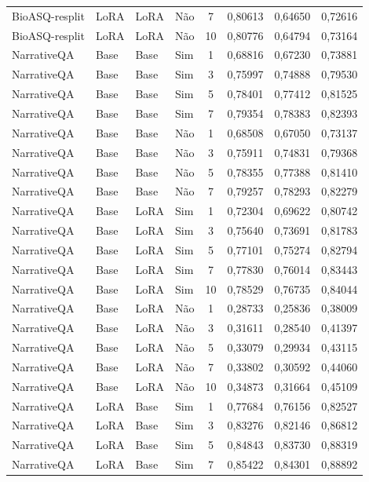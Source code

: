\begin{longtable}{llllcccc}
BioASQ-resplit & LoRA & LoRA & Não & 7 & 0,80613 & 0,64650 & 0,72616 \\
BioASQ-resplit & LoRA & LoRA & Não & 10 & 0,80776 & 0,64794 & 0,73164 \\
NarrativeQA & Base & Base & Sim & 1 & 0,68816 & 0,67230 & 0,73881 \\
NarrativeQA & Base & Base & Sim & 3 & 0,75997 & 0,74888 & 0,79530 \\
NarrativeQA & Base & Base & Sim & 5 & 0,78401 & 0,77412 & 0,81525 \\
NarrativeQA & Base & Base & Sim & 7 & 0,79354 & 0,78383 & 0,82393 \\
NarrativeQA & Base & Base & Não & 1 & 0,68508 & 0,67050 & 0,73137 \\
NarrativeQA & Base & Base & Não & 3 & 0,75911 & 0,74831 & 0,79368 \\
NarrativeQA & Base & Base & Não & 5 & 0,78355 & 0,77388 & 0,81410 \\
NarrativeQA & Base & Base & Não & 7 & 0,79257 & 0,78293 & 0,82279 \\
NarrativeQA & Base & LoRA & Sim & 1 & 0,72304 & 0,69622 & 0,80742 \\
NarrativeQA & Base & LoRA & Sim & 3 & 0,75640 & 0,73691 & 0,81783 \\
NarrativeQA & Base & LoRA & Sim & 5 & 0,77101 & 0,75274 & 0,82794 \\
NarrativeQA & Base & LoRA & Sim & 7 & 0,77830 & 0,76014 & 0,83443 \\
NarrativeQA & Base & LoRA & Sim & 10 & 0,78529 & 0,76735 & 0,84044 \\
NarrativeQA & Base & LoRA & Não & 1 & 0,28733 & 0,25836 & 0,38009 \\
NarrativeQA & Base & LoRA & Não & 3 & 0,31611 & 0,28540 & 0,41397 \\
NarrativeQA & Base & LoRA & Não & 5 & 0,33079 & 0,29934 & 0,43115 \\
NarrativeQA & Base & LoRA & Não & 7 & 0,33802 & 0,30592 & 0,44060 \\
NarrativeQA & Base & LoRA & Não & 10 & 0,34873 & 0,31664 & 0,45109 \\
NarrativeQA & LoRA & Base & Sim & 1 & 0,77684 & 0,76156 & 0,82527 \\
NarrativeQA & LoRA & Base & Sim & 3 & 0,83276 & 0,82146 & 0,86812 \\
NarrativeQA & LoRA & Base & Sim & 5 & 0,84843 & 0,83730 & 0,88319 \\
NarrativeQA & LoRA & Base & Sim & 7 & 0,85422 & 0,84301 & 0,88892 \\

\end{longtable}
